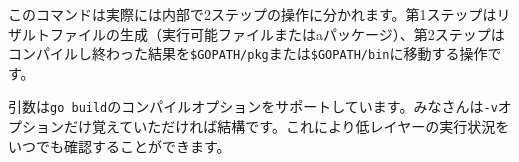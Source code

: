  このコマンドは実際には内部で2ステップの操作に分かれます。第1ステップはリザルトファイルの生成（実行可能ファイルまたはaパッケージ）、第2ステップはコンパイルし終わった結果を\texttt{\$GOPATH\//pkg}または\texttt{\$GOPATH\//bin}に移動する操作です。

 引数は\texttt{go build}のコンパイルオプションをサポートしています。みなさんは\texttt{-v}オプションだけ覚えていただければ結構です。これにより低レイヤーの実行状況をいつでも確認することができます。
 
